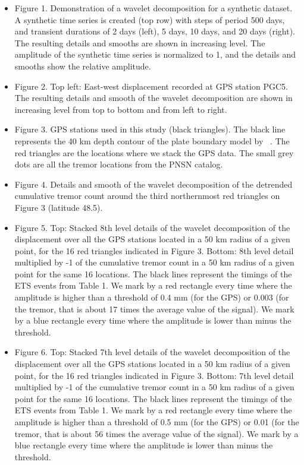 \documentclass{article}
\begin{document}
\begin{itemize}

\item Figure 1. Demonstration of a wavelet decomposition for a synthetic dataset. A synthetic time series is created (top row) with steps of period 500 days, and transient durations of 2 days (left), 5 days, 10 days, and 20 days (right). The resulting details and smooths are shown in increasing level. The amplitude of the synthetic time series is normalized to 1, and the details and smooths show the relative amplitude.

\item Figure 2. Top left: East-west displacement recorded at GPS station PGC5. The resulting details and smooth of the wavelet decomposition are shown in increasing level from top to bottom and from left to right.

\item Figure 3. GPS stations used in this study (black triangles). The black line represents the 40 km depth contour of the plate boundary model by ~\citet{PRE_2003}. The red triangles are the locations where we stack the GPS data. The small grey dots are all the tremor locations from the PNSN catalog.

\item Figure 4. Details and smooth of the wavelet decomposition of the detrended cumulative tremor count around the third northernmost red triangles on Figure 3 (latitude 48.5).

\item Figure 5. Top: Stacked 8th level details of the wavelet decomposition of the displacement over all the GPS stations located in a 50 km radius of a given point, for the 16 red triangles indicated in Figure 3. Bottom: 8th level detail multiplied by -1 of the cumulative tremor count in a 50 km radius of a given point for the same 16 locations. The black lines represent the timings of the ETS events from Table 1. We mark by a red rectangle every time where the amplitude is higher than a threshold of 0.4 mm (for the GPS) or 0.003 (for the tremor, that is about 17 times the average value of the signal). We mark by a blue rectangle every time where the amplitude is lower than minus the threshold.

\item Figure 6. Top: Stacked 7th level details of the wavelet decomposition of the displacement over all the GPS stations located in a 50 km radius of a given point, for the 16 red triangles indicated in Figure 3. Bottom: 7th level detail multiplied by -1 of the cumulative tremor count in a 50 km radius of a given point for the same 16 locations. The black lines represent the timings of the ETS events from Table 1. We mark by a red rectangle every time where the amplitude is higher than a threshold of 0.5 mm (for the GPS) or 0.01 (for the tremor, that is about 56 times the average value of the signal). We mark by a blue rectangle every time where the amplitude is lower than minus the threshold.


\end{itemize}
\end{document}
